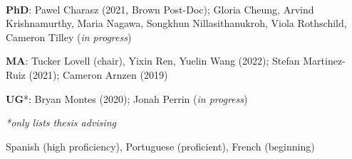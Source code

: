 \documentclass[11pt]{article}
\begin{document}
\vspace{.2in}
\begin{minipage}[t]{.21\textwidth}
	 \\
\end{minipage}
\begin{minipage}[t]{.79\textwidth}
	 \textbf{PhD}: Pawel Charasz (2021, Brown Post-Doc);  Gloria Cheung, Arvind Krishnamurthy, Maria Nagawa, Songkhun Nillasithanukroh, Viola Rothschild, Cameron Tilley (\emph{in progress})\\
	 \vspace{-.1in}

	 \textbf{MA}: Tucker Lovell (chair), Yixin Ren, Yuelin Wang (2022); Stefan Martinez-Ruiz (2021); Cameron Arnzen (2019)    \\
	 \vspace{-.1in}

	 \textbf{UG}*: Bryan Montes  (2020); Jonah Perrin (\emph{in progress}) \\
	 \vspace{-.2in}

 	\emph{*\scriptsize only lists thesis advising}	\\

\end{minipage}










\vspace{.2in}
\begin{minipage}[t]{.22\textwidth}
\end{minipage}
\begin{minipage}[t]{.78\textwidth}
	Spanish (high proficiency), Portuguese (proficient), French (beginning)  \\
\end{minipage}
\end{document}
